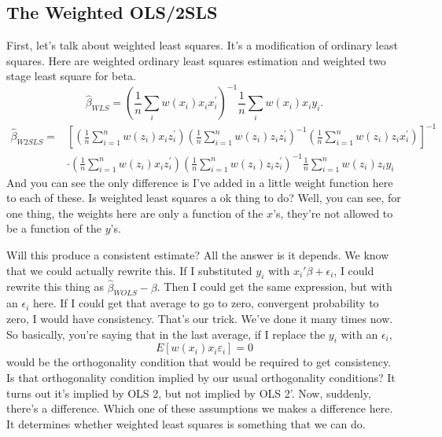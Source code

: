 \documentclass[11pt,a4paper]{amsart}
\theoremstyle{plain}
\theoremstyle{definition}
\begin{document}
\subsection{The Weighted OLS/2SLS} 
			   First, let's talk about weighted least squares. It's a modification of ordinary least squares. Here are weighted ordinary least squares estimation and weighted two stage least square for beta. 
			 \[  \hat{\beta}_{W L S}=\left(\frac{1}{n} \sum_{i} w\left(x_{i}\right) x_{i} x_{i}^{\prime}\right)^{-1} \frac{1}{n} \sum_{i} w\left(x_{i}\right) x_{i} y_{i}. \]
			 \[\begin{aligned}
			 \hat{\beta}_{W 2 S L S}=& {\left[\left(\frac{1}{n} \sum_{i=1}^{n} w\left(z_{i}\right) x_{i} z_{i}^{\prime}\right)\left(\frac{1}{n} \sum_{i=1}^{n} w\left(z_{i}\right) z_{i} z_{i}^{\prime}\right)^{-1}\left(\frac{1}{n} \sum_{i=1}^{n} w\left(z_{i}\right) z_{i} x_{i}^{\prime}\right)\right]^{-1} } \\
			 & \cdot\left(\frac{1}{n} \sum_{i=1}^{n} w\left(z_{i}\right) x_{i} z_{i}^{\prime}\right)\left(\frac{1}{n} \sum_{i=1}^{n} w\left(z_{i}\right) z_{i} z_{i}^{\prime}\right)^{-1} \frac{1}{n} \sum_{i=1}^{n} w\left(z_{i}\right) z_{i} y_{i}
			 \end{aligned}\]
			   And you can see the only difference is I've added in a little weight function here to each of these. Is weighted least squares a ok thing to do? Well, you can see, for one thing, the weights here are only a function of the $x$'s, they're not allowed to be a function of the $y$'s. \par 
			   Will this produce a consistent estimate? All the answer is it depends. We know that we could actually rewrite this. If I substituted $y_{i}$ with $x_{i}'\beta + \epsilon_{i}$,  I could rewrite this thing as $\hat{\beta}_{WOLS} - \beta$. Then I could get the same expression, but with an $\epsilon_{i}$ here. If I could get that average to go to zero, convergent probability to zero, I would have consistency. That's our trick. We've done it many times now. So basically, you're saying that in the last average, if I replace the $y_{i}$ with an $\epsilon_{i}$, 
			   \[	E\left[w\left(x_{i}\right) x_{i} \varepsilon_{i}\right]=0	\]
			   would be the orthogonality condition that would be required to get consistency. Is that orthogonality condition implied by our usual orthogonality conditions?  It turns out it's implied by OLS 2, but not implied by OLS 2'. Now, suddenly, there's a difference. Which one of these assumptions we makes a difference here. It determines whether weighted least squares is something that we can do. \par 
\end{document}
